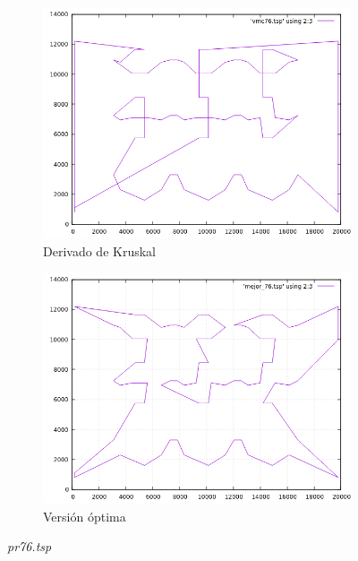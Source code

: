 \documentclass[12pt,spanish]{article}
\begin{document}
\begin{figure}[H]
\begin{subfigure}[b]{0.36\textwidth}
\includegraphics[width=\textwidth]{pr76_vmc.png}
\caption{Derivado de Kruskal}
\end{subfigure}
\quad
\begin{subfigure}[b]{0.36\textwidth}
\includegraphics[width=\textwidth]{pr76_mejor.png}
\caption{Versión óptima}
\end{subfigure}
\caption{\textit{pr76.tsp}}
\end{figure}
\end{document}
